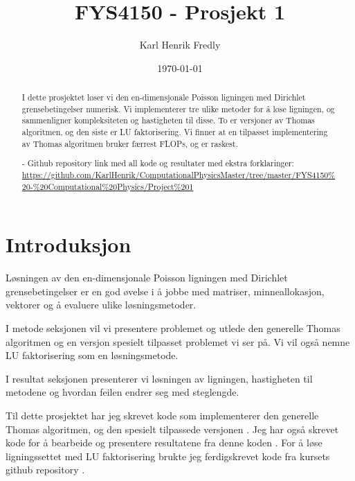 \documentclass[reprint,english,notitlepage]{revtex4-1}
\begin{document}
	
\title{FYS4150 - Prosjekt 1}
\date{\today}               
\author{Karl Henrik Fredly}

\newpage
	
\begin{abstract} %
	I dette prosjektet løser vi den en-dimensjonale Poisson ligningen med Dirichlet grensebetingelser numerisk. Vi implementerer tre ulike metoder for å løse ligningen, og sammenligner kompleksiteten og hastigheten til disse. To er versjoner av Thomas algoritmen, og den siste er LU faktorisering. Vi finner at en tilpasset implementering av Thomas algoritmen bruker færrest FLOPs, og er raskest.
	
	- Github repository link med all kode og resultater med ekstra forklaringer: \href{https://github.com/KarlHenrik/ComputationalPhysicsMaster/tree/master/FYS4150\%20-\%20Computational\%20Physics/Project\%201}{https://github.com/KarlHenrik/ComputationalPhysicsMaster/tree/master/FYS4150\%20-\%20Computational\%20Physics/Project\%201}
\end{abstract}
\maketitle

\section{Introduksjon} %
	Løsningen av den en-dimensjonale Poisson ligningen med Dirichlet grensebetingelser er en god øvelse i å jobbe med matriser, minneallokasjon, vektorer og å evaluere ulike løsningsmetoder.
	
	I metode seksjonen vil vi presentere problemet og utlede den generelle Thomas algoritmen og en versjon spesielt tilpasset problemet vi ser på. Vi vil også nemne LU faktorisering som en løsningsmetode.
	
	I resultat seksjonen presenterer vi løsningen av ligningen, hastigheten til metodene og hvordan feilen endrer seg med steglengde.
	
	Til dette prosjektet har jeg skrevet kode som implementerer den generelle Thomas algoritmen, og den spesielt tilpassede versjonen \cite{myRepo}. Jeg har også skrevet kode for å bearbeide og presentere resultatene fra denne koden \cite{myRepo}. For å løse ligningssettet med LU faktorisering brukte jeg ferdigskrevet kode fra kursets github repository \cite{libRepo}\cite{cspRepo}.
\end{document}
